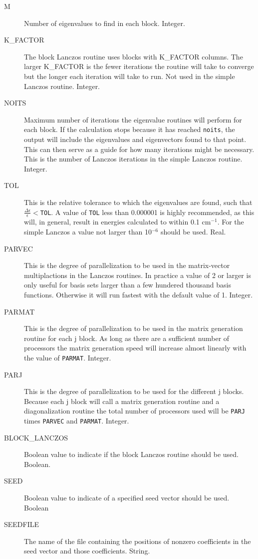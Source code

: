 \documentclass{article}
\newcommand{\wn}{cm$^{-1}$}
\begin{document}
\begin{description}
\item[M] Number of eigenvalues to find in each block. Integer.

\item[K\_FACTOR] The block Lanczos routine uses blocks with 
  K\_FACTOR columns. The larger K\_FACTOR is the fewer iterations
  the routine will take to converge but the longer each iteration
  will take to run. Not used in the simple Lanczos routine. Integer.

\item[NOITS] Maximum number of iterations the eigenvalue routines
  will perform for each block. If the calculation stops because it has
  reached {\tt noits}, the output will include the eigenvalues and
  eigenvectors found to that point. This can then serve as a guide for
  how many iterations might be necessary. This is the number of Lanczos
  iterations in the simple Lanczos routine. Integer.

\item[TOL] This is the relative tolerance to which
  the eigenvalues are found, such that $\frac{\Delta \epsilon
    }{\epsilon } < ${\tt TOL}. A value of {\tt TOL} less than 0.000001 is highly
  recommended, as this will, in general, result in energies calculated
  to within 0.1 \wn . For the simple Lanczos a value not larger than 10$^{-6}$
  should be used. Real.
  
\item[PARVEC] This is the degree of parallelization to be used in
  the matrix-vector multiplactions in the Lanczos routines. In 
  practice a value of 2 or larger is only useful for basis sets larger than
  a few hundered thousand basis functions. Otherwise it will run
  fastest with the default value of 1. Integer.

\item[PARMAT] This is the degree of parallelization to be used in
  the matrix generation routine for each j block. As long as there are
  a sufficient number of processors the matrix generation speed 
  will increase almost linearly with the value of {\tt PARMAT}. Integer.

\item[PARJ] This is the degree of parallelization to be used for
  the different j blocks.  Because each j block will call a matrix
  generation routine and a diagonalization routine the total number
  of processors used will be {\tt PARJ} times {\tt PARVEC} and {\tt PARMAT}. Integer.

\item[BLOCK\_LANCZOS] Boolean value to indicate if the block Lanczos
  routine should be used. Boolean.
  
\item[SEED] Boolean value to indicate of a specified seed vector should be used. Boolean

\item[SEEDFILE] The name of the file containing the positions of nonzero coefficients in the seed vector and those coefficients. String.

\end{description}
\end{document}
